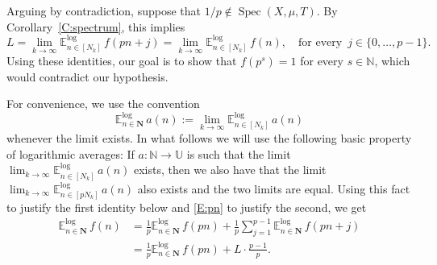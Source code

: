\documentclass[11pt]{amsart}
\theoremstyle{definition}
\newcommand{\lE}{\mathbb{E}^{\log}}
\newcommand{\N}{{\mathbb N}}
\newcommand{\U}{{\mathbb U}}
\newcommand{\bN}{{\mathbf{N}}}
\DeclareMathOperator{\spec}{Spec}
\begin{document}
Arguing by contradiction, suppose that $1/p\notin \spec(X,\mu,T)$.  By Corollary~\ref{C:spectrum}, this implies
\begin{equation}\label{E:pn}
L=\lim_{k\to\infty}\lE_{n\in [N_k]} \, f(pn+j) = \lim_{k\to\infty} \lE_{n\in [N_k]} \, f(n), \quad \text{for every }\,  j\in \{0,\ldots, p-1\}.
\end{equation}
Using these identities, our goal is to show that  $f(p^s)= 1$ for every $s\in\N$, which would contradict our hypothesis.



For convenience, we use the convention
$$
\lE_{n\in \bN}\,  a(n):=\lim_{k\to\infty}\lE_{n\in [N_k]} \, a(n)
$$
whenever the limit exists.
In what follows we will use  the following basic property of logarithmic averages:
If $a\colon \N\to \U$  is such that the limit  $\lim_{k\to\infty}\lE_{n\in [N_k]} \, a(n)$ exists,
then we also have  that the limit $\lim_{k\to\infty}\lE_{n\in [p N_k]} \, a(n)$  also exists and
the two limits are equal. Using this fact to justify the first identity below and
  \eqref{E:pn} to justify the second, we get
\begin{align*}
\lE_{n\in \bN}\, f(n)& = \frac{1}{p} \lE_{n\in \bN}\, f(pn)
+\frac{1}{p}\sum_{j=1}^{p-1}\lE_{n\in \bN}\, f(pn+j)\\
& =
\frac{1}{p} \lE_{n\in \bN}\, f(pn)+L  \cdot \frac{p-1}{p}.
\end{align*}
\end{document}
